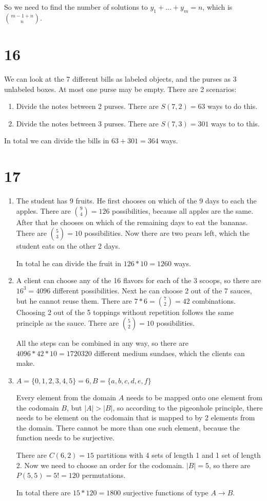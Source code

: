 \documentclass[12pt]{article}
\begin{document}
So we need to find the number of solutions to $y_1 + \dots + y_m = n$, which is $\binom{m - 1 + n}{n}$.

\section*{16}
We can look at the 7 different bills as labeled objects, and the purses as 3 unlabeled boxes. At most one purse may be empty. There are 2 scenarios:

\begin{enumerate}
	\item
	Divide the notes between 2 purses. There are $S(7, 2) = 63$ ways to do this.
	\item
	Divide the notes between 3 purses. There are $S(7, 3) = 301$ ways to to this.
\end{enumerate}

In total we can divide the bills in $63 + 301 = 364$ ways.

\section*{17}
\begin{enumerate}[a]
	\item %
	The student has 9 fruits. He first chooses on which of the 9 days to each the apples. There are $\binom{9}{4} = 126$ possibilities, because all apples are the same. After that he chooses on which of the remaining days to eat the bananas. There are $\binom{5}{3} = 10$ possibilities. Now there are two pears left, which the student eats on the other 2 days.

	In total he can divide the fruit in $126 * 10 = 1260$ ways.
	\item %
	A client can choose any of the 16 flavors for each of the 3 scoops, so there are $16^3 = 4096$ different possibilities. Next he can choose 2 out of the 7 sauces, but he cannot reuse them. There are $7 * 6 = \binom{7}{2} = 42$ combinations. Choosing 2 out of the 5 toppings without repetition follows the same principle as the sauce. There are $\binom{5}{2} = 10$ possibilities.

	All the steps can be combined in any way, so there are $4096 * 42 * 10 = 1720320$ different medium sundaes, which the clients can make.
	\item %
	$A = \{0, 1, 2, 3, 4, 5\} = 6, B = \{a, b, c, d, e, f\}$

	Every element from the domain $A$ needs to be mapped onto one element from the codomain $B$, but $|A| > |B|$, so according to the pigeonhole principle, there needs to be element on the codomain that is mapped to by 2 elements from the domain. There cannot be more than one such element, because the function needs to be surjective.

	There are $C(6, 2) = 15$ partitions with 4 sets of length 1 and 1 set of length 2. Now we need to choose an order for the codomain. $|B| = 5$, so there are $P(5, 5) = 5! = 120$ permutations.

	In total there are $15 * 120 = 1800$ surjective functions of type $A \rightarrow B$.
\end{enumerate}
\end{document}
